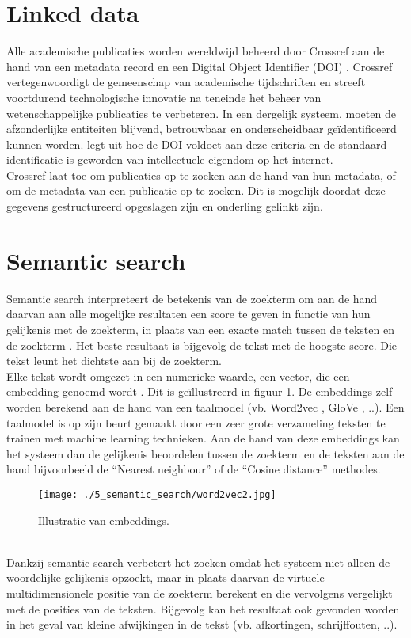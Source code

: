 \section{Linked data}
Alle academische publicaties worden wereldwijd beheerd door Crossref aan de hand van een metadata record en een Digital Object Identifier (DOI) \autocite{Hendricks2020}. Crossref vertegenwoordigt de gemeenschap van academische tijdschriften en streeft voortdurend technologische innovatie na teneinde het beheer van wetenschappelijke publicaties te verbeteren.
In een dergelijk systeem, moeten de afzonderlijke entiteiten blijvend, betrouwbaar en onderscheidbaar geïdentificeerd kunnen worden. \textcite{Chandrakar2006} legt uit hoe de DOI voldoet aan deze criteria en de standaard identificatie is geworden van intellectuele eigendom op het internet.\\
Crossref laat toe om publicaties op te zoeken aan de hand van hun metadata, of om de metadata van een publicatie op te zoeken. Dit is mogelijk doordat deze gegevens gestructureerd opgeslagen zijn en onderling gelinkt zijn.
\section{Semantic search}
Semantic search interpreteert de betekenis van de zoekterm om aan de hand daarvan aan alle mogelijke resultaten een score te geven in functie van hun gelijkenis met de zoekterm, in plaats van een exacte match tussen de teksten en de zoekterm \autocite{Bast2016}. Het beste resultaat is bijgevolg de tekst met de hoogste score. Die tekst leunt het dichtste aan bij de zoekterm.\\
Elke tekst wordt omgezet in een numerieke waarde, een vector, die een embedding genoemd wordt
\autocite{Almeida2019}. Dit is geïllustreerd in figuur \ref{fig:Word2vec}. De embeddings zelf worden berekend aan de hand van een taalmodel (vb. Word2vec \autocite{Word2vec2025}, GloVe \autocite{Glove2025}, ..). Een taalmodel is op zijn beurt gemaakt door een zeer grote verzameling teksten te trainen met machine learning technieken. Aan de hand van deze embeddings kan het systeem dan de gelijkenis beoordelen tussen de zoekterm en de teksten aan de hand bijvoorbeeld de ``Nearest neighbour'' of de ``Cosine distance'' methodes.
\begin{figure}
    \centering
    \texttt{[image: ./5\_semantic\_search/word2vec2.jpg]}
    \caption[Illustratie van embeddings.]{\label{fig:Word2vec}Illustratie van embeddings.}
\end{figure}\\
Dankzij semantic search verbetert het zoeken omdat het systeem niet alleen de woordelijke gelijkenis opzoekt, maar in plaats daarvan de virtuele multidimensionele positie van de zoekterm berekent en die vervolgens vergelijkt met de posities van de teksten. Bijgevolg kan het resultaat ook gevonden worden in het geval van kleine afwijkingen in de tekst (vb. afkortingen, schrijffouten, ..). 




